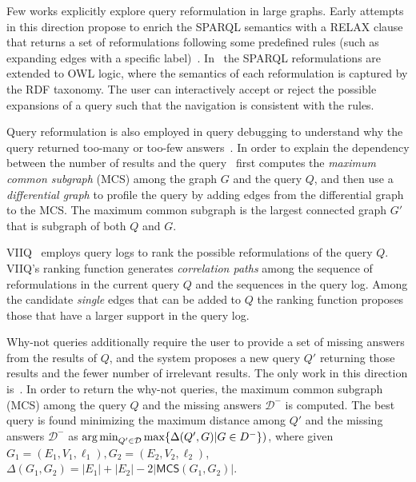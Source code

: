 Few works explicitly explore query reformulation in large graphs.
Early attempts in this direction propose to enrich the SPARQL semantics with a \textsc{RELAX} clause that returns a set of reformulations following some predefined rules (such as expanding edges with a specific label)~\citep{hurtado2008query}.
In~\citep{arenas2014faceted} the SPARQL reformulations are extended to OWL logic, where the semantics of each reformulation is captured by the RDF taxonomy. 
The user can interactively accept or reject the possible expansions of a query such that the navigation is consistent with the rules. 

Query reformulation is also employed in query debugging to understand why the query returned too-many or too-few answers~\citep{vasilyeva2016answering}. 
In order to explain the dependency between the number of results and the query~\citep{vasilyeva2016answering} first computes the \emph{maximum common subgraph} (MCS) among the graph $G$ and the query $Q$, and then use a \emph{differential graph} to profile the query by adding edges from the differential graph to the MCS. 
The maximum common subgraph is the largest connected graph $G'$ that is subgraph of both $Q$ and $G$. 

VIIQ~\cite{jayaram2015viiq} employs query logs to rank the possible reformulations of the query $Q$. 
VIIQ's ranking function generates \emph{correlation paths} among the sequence of reformulations in the current query $Q$ and the sequences in the query log. 
Among the candidate \emph{single} edges that can be added to $Q$ the ranking function proposes those that have a larger support in the query log. 



Why-not queries additionally require the user to provide a set of missing answers from the results of $Q$, and the system proposes a new query $Q'$ returning those results and the fewer number of irrelevant results. 
The only work in this direction is~\cite{islam2015efficient}. 
In order to return the why-not queries, the maximum common subgraph (MCS) among the query $Q$ and the missing answers $\mathcal{D}^-$ is computed. The best query is found minimizing the maximum distance among $Q'$ and the missing answers $\mathcal{D}^-$ as $\operatorname*{\arg\min}_{Q'\in \mathcal{D}} \max\{\Delta(Q',G)|G \in D^{-}\})$, where given $G_1 = (E_1,V_1, \ell_1), G_2 = (E_2,V_2, \ell_2)$, $\Delta(G_1, G_2) = |E_1| + |E_2| - 2 |\mathsf{MCS}(G_1,G_2)|$. 



